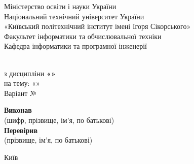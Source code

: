 \begin{titlepage}
    \begin{center}
        \Large
        Міністерство освіти і науки України \\
        Національний технічний університет України \\
        «Київський політехнічний інститут імені Ігоря Сікорського» \\
        [1\baselineskip]
        Факультет інформатики та обчислювальної техніки \\
        Кафедра інформатики та програмної інженерії \\
    \end{center}

    \vfill

    \begin{center}
        \Large
        \textbf{\TITLE} \\
        з дисципліни \textbf{«\DISCIPLINE»} \\
        на тему: «\SUBJECT» \\
        [1\baselineskip]
        Варіант №\VARIANT \\
    \end{center}

    \vfill

    \begin{center}
        \large
        \textbf{Виконав} \hfill \noindent \hrulefill \STUDENT \hrulefill \\
        \small (шифр, прізвище, ім'я, по батькові) \\
        [1\baselineskip]
        \large
        \textbf{Перевірив} \hfill \noindent \hrulefill \TEACHER \hrulefill \\
        \small (прізвище, ім'я, по батькові) \\
    \end{center}

    \vfill

    \begin{center}
        \Large
        Київ \the\year{}
    \end{center}
\end{titlepage}
